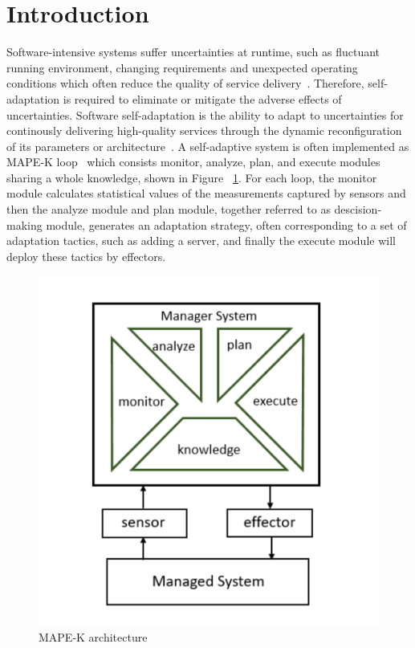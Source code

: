 \documentclass[sigconf]{acmart}
\begin{document}
\maketitle

\section{Introduction}
Software-intensive systems suffer uncertainties at runtime, such as fluctuant running environment, changing requirements and unexpected operating conditions which often reduce the quality of service delivery~\cite{filieri2015software}. Therefore, self-adaptation is required to eliminate or mitigate the adverse effects of uncertainties. Software self-adaptation is the ability to adapt to uncertainties for continously delivering high-quality services through the dynamic reconfiguration of its parameters or architecture~\cite{calinescu2017engineering}. A self-adaptive system is often implemented as MAPE-K loop~\cite{kephart2003vision} which consists monitor, analyze, plan, and execute modules sharing a whole knowledge, shown in Figure ~\ref{fig:mape}. For each loop, the monitor module calculates statistical values of the measurements captured by sensors and then the analyze module and plan module, together referred to as descision-making module, generates an adaptation strategy, often corresponding to a set of adaptation tactics, such as adding a server, and finally the execute module will deploy these tactics by effectors. 

\begin{figure}[h]	
	\centering	
	\includegraphics[width=\linewidth]{mape}	
	\caption{MAPE-K architecture}	
	\label{fig:mape}	
\end{figure}
\end{document}
